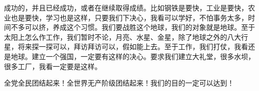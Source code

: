 成功的，并且已经成功，或者在继续取得成绩。比如钢铁是要快，工业是要快，农业也是要快，学习也是这样，只要我们下决心，我看可以学好，不怕事务太多，时间不多可以挤，养成这个习惯。我们要战胜这个地球，我们的对象就是地球。至于太阳上怎么作工作，我们暂时不论，月亮、水星、金星，除了地球之外的八大行星，将来探一探可以，拜访拜访可以，假如能上去。至于工作，我们打仗，我看还是地球。建立一个强国，一定要有这样的决心。要求我们建立大礼堂，很多水坝，很多工厂，我看一定要是这样。

全党全民团结起来！全世界无产阶级团结起来！我们的目的一定可以达到！


